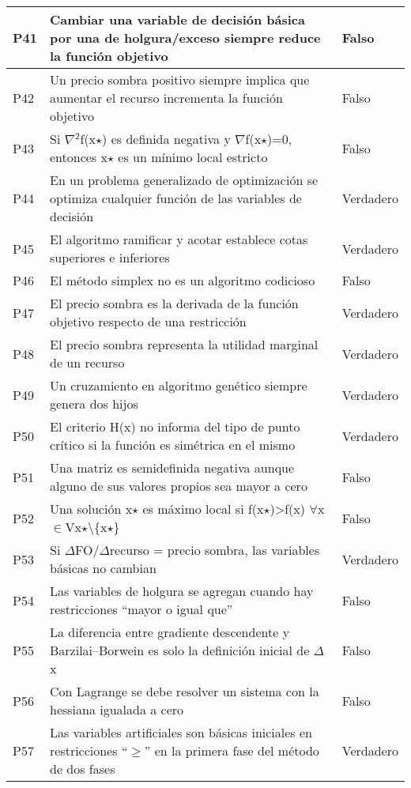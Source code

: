 \documentclass{article}
\begin{document}
\begin{longtable}{|p{1.5cm}|p{14cm}|p{2cm}|}
P41 & Cambiar una variable de decisión básica por una de holgura/exceso siempre reduce la función objetivo & Falso \\ \hline
P42 & Un precio sombra positivo siempre implica que aumentar el recurso incrementa la función objetivo & Falso \\ \hline
P43 & Si $\nabla$$^2$f(x$\star$) es definida negativa y $\nabla$f(x$\star$)=0, entonces x$\star$ es un mínimo local estricto & Falso \\ \hline
P44 & En un problema generalizado de optimización se optimiza cualquier función de las variables de decisión & Verdadero \\ \hline
P45 & El algoritmo ramificar y acotar establece cotas superiores e inferiores & Verdadero \\ \hline
P46 & El método simplex no es un algoritmo codicioso & Falso \\ \hline
P47 & El precio sombra es la derivada de la función objetivo respecto de una restricción & Verdadero \\ \hline
P48 & El precio sombra representa la utilidad marginal de un recurso & Verdadero \\ \hline
P49 & Un cruzamiento en algoritmo genético siempre genera dos hijos & Verdadero \\ \hline
P50 & El criterio H(x) no informa del tipo de punto crítico si la función es simétrica en el mismo & Verdadero \\ \hline
P51 & Una matriz es semidefinida negativa aunque alguno de sus valores propios sea mayor a cero & Falso \\ \hline
P52 & Una solución x$\star$ es máximo local si f(x$\star$)>f(x) $\forall$x$\in$Vx$\star$$\setminus$\{x$\star$\} & Falso \\ \hline
P53 & Si $\Delta$FO/$\Delta$recurso = precio sombra, las variables básicas no cambian & Verdadero \\ \hline
P54 & Las variables de holgura se agregan cuando hay restricciones “mayor o igual que” & Falso \\ \hline
P55 & La diferencia entre gradiente descendente y Barzilai–Borwein es solo la definición inicial de $\Delta$x & Falso \\ \hline
P56 & Con Lagrange se debe resolver un sistema con la hessiana igualada a cero & Falso \\ \hline
P57 & Las variables artificiales son básicas iniciales en restricciones “$\geq$” en la primera fase del método de dos fases & Verdadero \\ \hline

\end{longtable}
\end{document}

